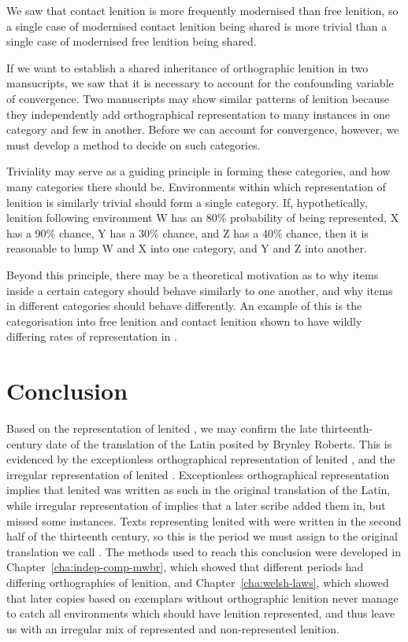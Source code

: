 We saw that contact lenition is more frequently modernised than free lenition, so a single case of modernised contact lenition being shared is more trivial than a single case of modernised free lenition being shared. 

If we want to establish a shared inheritance of orthographic lenition in two mansucripts, we saw that it is necessary to account for the confounding variable of convergence. Two manuscripts may show similar patterns of lenition because they independently add orthographical representation to many instances in one category and few in another. Before we can account for convergence, however, we must develop a method to decide on such categories.

Triviality may serve as a guiding principle in forming these categories, and how many categories there should be. Environments within which representation of lenition is similarly trivial should form a single category. If, hypothetically, lenition following environment W has an 80\% probability of being represented, X has a 90\% chance, Y has a 30\% chance, and Z has a 40\% chance, then it is reasonable to lump W and X into one category, and Y and Z into another.

Beyond this principle, there may be a theoretical motivation as to why items inside a certain category should behave similarly to one another, and why items in different categories should behave differently. An example of this is the categorisation into free lenition and contact lenition shown to have wildly differing rates of representation in .

\section{Conclusion}
\label{sec:dewi-conclusion}

Based on the representation of lenited , we may confirm the late thirteenth-century date of the translation of the Latin  posited by Brynley Roberts. This is evidenced by the exceptionless orthographical representation of lenited , and the irregular representation of lenited . Exceptionless orthographical representation implies that lenited  was written as such in the original translation of the Latin, while irregular representation of  implies that a later scribe added them in, but missed some instances. Texts representing lenited  with  were written in the second half of the thirteenth century, so this is the period we must assign to the original translation we call . The methods used to reach this conclusion were developed in Chapter~\ref{cha:indep-comp-mwbr}, which showed that different periods had differing orthographies of lenition, and Chapter~\ref{cha:welsh-laws}, which showed that later copies based on exemplars without orthographic lenition never manage to catch all environments which should have lenition represented, and thus leave us with an irregular mix of represented and non-represented lenition.

